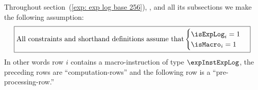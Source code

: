 Throughout section~(\ref{exp: exp log base 256}), , and all its subsections we make the following assumption:
\[
    \boxed{\text{All constraints and shorthand definitions assume that}
        \begin{cases}
            \isExpLog _{i} = 1 \\
            \isMacro  _{i} = 1 \\
        \end{cases}}
\]
In other words row $i$ contains a macro-instruction of type $\expInstExpLog$, the preceding rows are ``computation-rows'' and the following row is a ``pre-processing-row.''
